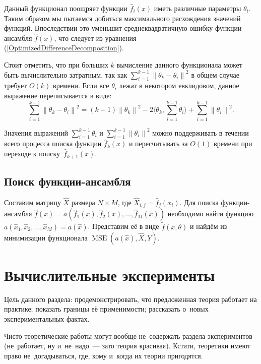 \documentclass[12pt, fleqn]{article}
\newcommand{\norm}[1]{\left\lVert#1\right\rVert}
\newcommand{\mse}{\mathop{MSE}}
\newcommand{\scalarproduct}[1]{\langle #1 \rangle}
\newcommand{\optimizationmethodfunction}{\tilde{f}}
\newcommand{\predictionfunction}{\hat{f}}
\newcommand{\ensemblefunction}{a}
\newcommand{\objects}{X}
\newcommand{\results}{Y}
\newcommand{\predictedobjects}{\hat{\objects}}
\newcommand{\numberobjects}{N}
\newcommand{\numberpredictionfunctions}{M}
\newcommand{\for}[3]{\sum\limits_{#1 = #2}^{#3}}  %
\newcommand{\forn}[2]{\for{#1}{1}{#2}}  %
\newcommand{\many}[3]{#1 1 #2, #1 2 #2, \dots, #1 #3 #2}  %
\newcommand{\reference}[1]{(\ref{#1})}
\newcommand{\ensemblefunctionfull}{\ensemblefunction(\many{\predictionfunction_}{(x)}{\numberpredictionfunctions})}
\begin{document}
Данный функционал поощряет функции $\predictionfunction_i(x)$ иметь различные параметры $\theta_i$. Таким образом мы пытаемся добиться максимального расхождения значений функций. Впоследствии это уменьшит среднеквадратичную ошибку функции-ансамбля $\predictionfunction(x)$, что следует из уравнения \reference{OptimizedDifferenceDecomposition}.

Стоит отметить, что при больших $k$ вычисление данного функционала может быть вычислительно затратным, так как $\forn{i}{k - 1}\norm{\theta_k - \theta_i}^2$ в общем случае требует $O(k)$ времени. Если все $\theta_i$ лежат в некотором евклидовом, данное выражение переписывается в виде:
$$
\forn{i}{k - 1}\norm{\theta_k - \theta_i}^2 = (k - 1)\norm{\theta_k}^2 - 2\scalarproduct{\theta_k, \forn{i}{k - 1} \theta_i} + \forn{i}{k - 1}\norm{\theta_i}^2.
$$

Значения выражений $\forn{i}{k - 1} \theta_i$ и $\forn{i}{k - 1}\norm{\theta_i}^2$ можно поддерживать в течении всего процесса поиска функции $\predictionfunction_k(x)$ и пересчитывать за $O(1)$ времени при переходе к поиску~$\predictionfunction_{k+1}(x)$.

\subsection{Поиск функции-ансамбля}

Составим матрицу $\predictedobjects$ размера $\numberobjects \times \numberpredictionfunctions$, где $\predictedobjects_{i, j} = \predictionfunction_j(x_i)$.
Для поиска функции-ансамбля $\predictionfunction(x) = \ensemblefunctionfull$ необходимо найти функцию $\ensemblefunction(\many{\hat{x}_}{}{\numberpredictionfunctions}) = \ensemblefunction(\hat{x})$.
Представим её в виде $\optimizationmethodfunction(x, \theta)$ и найдём из минимизации функционала $\mse(\ensemblefunction(\hat{x}), \predictedobjects, \results)$.

\section{Вычислительные эксперименты}

Цель данного раздела:
продемонстрировать, что предложенная теория работает на практике;
показать границы её применимости;
рассказать о~новых экспериментальных фактах.

Чисто теоретические работы могут вообще не~содержать раздела экспериментов
(не~работает, ну и~не~надо~--- зато теория красивая).
Кстати, теоретики имеют право не~догадываться, где, кому и~когда их теории пригодятся.
\end{document}
